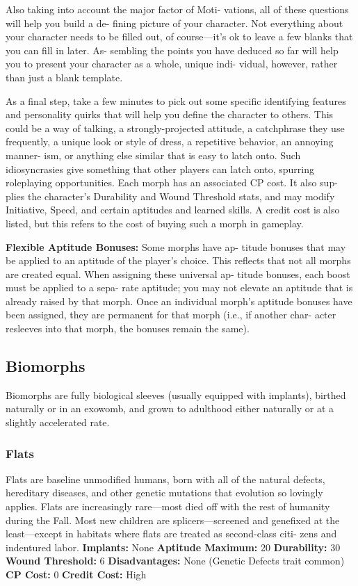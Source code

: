 Also taking into account the major factor of Moti-
vations, all of these questions will help you build a de-
fining picture of your character. Not everything about 
your character needs to be filled out, of course—it's 
ok to leave a few blanks that you can fill in later. As-
sembling the points you have deduced so far will help 
you to present your character as a whole, unique indi-
vidual, however, rather than just a blank template.

As a final step, take a few minutes to pick out some 
specific identifying features and personality quirks that 
will help you define the character to others. This could 
be a way of talking, a strongly-projected attitude, a 
catchphrase they use frequently, a unique look or style 
of dress, a repetitive behavior, an annoying manner-
ism, or anything else similar that is easy to latch onto. 
Such idiosyncrasies give something that other players 
can latch onto, spurring roleplaying opportunities.
Each morph has an associated CP cost. It also sup-
plies the character's Durability and Wound Threshold 
stats, and may modify Initiative, Speed, and certain 
aptitudes and learned skills. A credit cost is also listed, 
but this refers to the cost of buying such a morph in 
gameplay.

\textbf{Flexible Aptitude Bonuses:} Some morphs have ap-
titude bonuses that may be applied to an aptitude of 
the player's choice. This reflects that not all morphs 
are created equal. When assigning these universal ap-
titude bonuses, each boost must be applied to a sepa-
rate aptitude; you may not elevate an aptitude that 
is already raised by that morph. Once an individual 
morph's aptitude bonuses have been assigned, they 
are permanent for that morph (i.e., if another char-
acter resleeves into that morph, the bonuses remain 
the same).

\subsection{Biomorphs}

Biomorphs are fully biological sleeves (usually 
equipped with implants), birthed naturally or in an 
exowomb, and grown to adulthood either naturally 
or at a slightly accelerated rate.

\subsubsection{Flats}

Flats are baseline unmodified humans, born with all 
of the natural defects, hereditary diseases, and other 
genetic mutations that evolution so lovingly applies. 
Flats are increasingly rare—most died off with the rest 
of humanity during the Fall. Most new children are 
splicers—screened and genefixed at the least—except 
in habitats where flats are treated as second-class citi-
zens and indentured labor.
\textbf{Implants: }None
\textbf{Aptitude Maximum: }20
\textbf{Durability:} 30
\textbf{Wound Threshold:} 6
\textbf{Disadvantages: }None (Genetic Defects trait common)
\textbf{CP Cost: }0
\textbf{Credit Cost: }High

